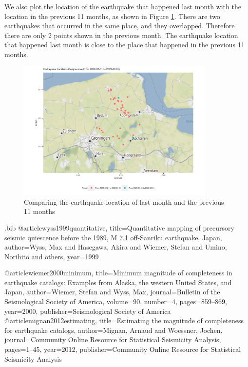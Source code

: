 \documentclass[11pt]{article}
\begin{document}
\begin{CJK}{UTF8}{gbsn}
We also plot the location of the earthquake that happened last month with the location in the previous 11 months, as shown in Figure \ref{fig:c1}. There are two earthquakes that occurred in the same place, and they overlapped. Therefore there are only 2 points shown in the previous month. The earthquake location that happened last month is close to the place that happened in the previous 11 months.

\begin{figure}[h]
  \centering
  \includegraphics[height=7cm]{../../outputs/com_loc_plot.png}
  \caption{Comparing the earthquake location of last month and the previous 11 months}
  \label{fig:c1}
\end{figure}




\clearpage



 


\begin{filecontents}{\jobname.bib}
@article{wyss1999quantitative,
  title={Quantitative mapping of precursory seismic quiescence before the 1989, M 7.1 off-Sanriku earthquake, Japan},
  author={Wyss, Max and Hasegawa, Akira and Wiemer, Stefan and Umino, Norihito and others},
  year={1999}
}

@article{wiemer2000minimum,
  title={Minimum magnitude of completeness in earthquake catalogs: Examples from Alaska, the western United States, and Japan},
  author={Wiemer, Stefan and Wyss, Max},
  journal={Bulletin of the Seismological Society of America},
  volume={90},
  number={4},
  pages={859--869},
  year={2000},
  publisher={Seismological Society of America}
}
@article{mignan2012estimating,
  title={Estimating the magnitude of completeness for earthquake catalogs},
  author={Mignan, Arnaud and Woessner, Jochen},
  journal={Community Online Resource for Statistical Seismicity Analysis},
  pages={1--45},
  year={2012},
  publisher={Community Online Resource for Statistical Seismicity Analysis}
}
\end{filecontents}

\end{CJK}
\end{document}
